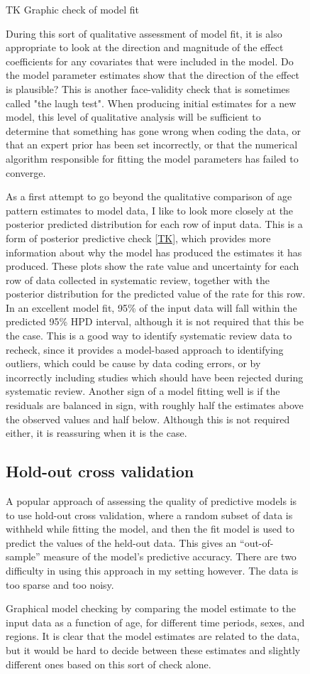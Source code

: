 \begin{figure}
\begin{center}
TK Graphic check of model fit
\end{center}
\caption{Graphical model checking by comparing the model estimate to
  the input data as a function of age, for different time periods,
  sexes, and regions.  It is clear that the model estimates are
  related to the data, but it would be hard to decide between these
  estimates and slightly different ones based on this sort of check
  alone.}

During this sort of qualitative assessment of model fit, it is also
appropriate to look at the direction and magnitude of the effect
coefficients for any covariates that were included in the model.  Do
the model parameter estimates show that the direction of the effect is
plausible?  This is another face-validity check that is sometimes
called "the laugh test".  When producing initial estimates for a new
model, this level of qualitative analysis will be sufficient to determine
that something has gone wrong when coding the data, or that an expert
prior has been set incorrectly, or that the numerical algorithm
responsible for fitting the model parameters has failed to converge.

As a first attempt to go beyond the qualitative comparison of age
pattern estimates to model data, I like to look more closely at the
posterior predicted distribution for each row of input data.  This is
a form of posterior predictive check \ref{TK}, which provides more
information about why the model has produced the estimates it has produced.
These plots show the rate value and uncertainty for each row of data
collected in systematic review, together with the posterior
distribution for the predicted value of the rate for this row.  In an
excellent model fit, 95\% of the input data will fall within the 
predicted 95\% HPD interval, although it is not required that this be
the case.    This is a good way to identify systematic review data to
recheck, since it provides a model-based approach to identifying
outliers, which could be cause by data coding errors, or by
incorrectly including studies which should have been rejected during
systematic review.  Another sign of a model fitting well is if the residuals
are balanced in sign, with roughly half the estimates above the
observed values and half below.  Although this is not required either,
it is reassuring when it is the case.


\subsection{Hold-out cross validation}
A popular approach of assessing the quality of predictive models is to
use hold-out cross validation, where a random subset of data is
withheld while fitting the model, and then the fit model is used to
predict the values of the held-out data.  This gives an
``out-of-sample'' measure of the model's predictive accuracy.  There
are two difficulty in using this approach in my setting however.  The
data is too sparse and too noisy.


\end{figure}
